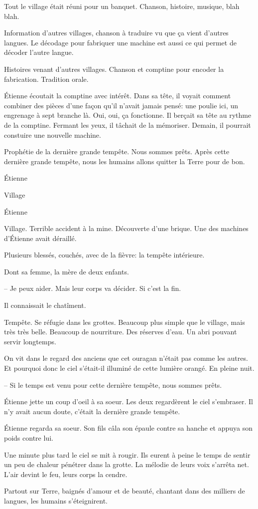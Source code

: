 Tout le village était réuni pour un banquet. Chanson, histoire, musique, blah blah.

Information d'autres villages, chanson à traduire vu que ça vient d'autres langues.
Le décodage pour fabriquer une machine est aussi ce qui permet de décoder l'autre langue.

Histoires venant d'autres villages. Chanson et comptine pour encoder la fabrication. 
Tradition orale.

Étienne écoutait la comptine avec intérêt. Dans sa tête, il voyait comment combiner des pièces d'une
façon qu'il n'avait jamais pensé: une poulie ici, un engrenage à sept branche là. Oui, oui, ça fonctionne.
Il berçait sa tête au rythme de la comptine. Fermant les yeux, il tâchait de la mémoriser.
Demain, il pourrait constuire une nouvelle machine.

Prophétie de la dernière grande tempête. Nous sommes prêts.
Après cette dernière grande tempête, nous les humains allons quitter la Terre pour de bon.

\sautSection{}

Étienne 

\sautSection{}

Village 

\sautSection{}

Étienne

\sautSection{}

Village. Terrible accident à la mine. Découverte d'une brique.
Une des machines d'Étienne avait déraillé.

Plusieurs blessés, couchés, avec de la fièvre: la tempête intérieure.

Dont sa femme, la mère de deux enfants.

-- Je peux aider. Mais leur corps va décider. Si c'est la fin.


Il connaissait le chatîment.

\sautSection{}

Tempête. Se réfugie dans les grottes. Beaucoup plus simple que le village, mais très très belle.
Beaucoup de nourriture. Des réserves d'eau. Un abri pouvant servir longtemps.


On vit dans le regard des anciens que cet ouragan n'était pas comme les autres.
Et pourquoi donc le ciel s'était-il illuminé de cette lumière orangé. En pleine nuit.

-- Si le temps est venu pour cette dernière tempête, nous sommes prêts.

Étienne jette un coup d'oeil à sa soeur. Les deux regardèrent le ciel s'embraser.
Il n'y avait aucun doute, c'était la dernière grande tempête.

Étienne regarda sa soeur. Son fils câla son épaule contre sa hanche et appuya son poids contre lui.

Une minute plus tard le ciel se mit à rougir.  
%
Ils eurent à peine le temps de
sentir un peu de chaleur pénétrer dans la grotte. 
%
La mélodie de leurs voix s'arrêta net.
%
L'air devint le feu, leurs corps la cendre.


Partout sur Terre, baignés d'amour et de beauté, chantant dans des milliers de langues, les humains s'éteignirent.


